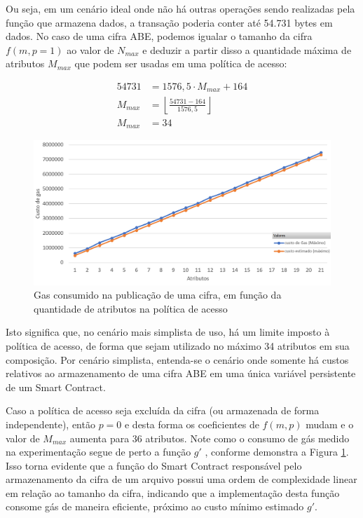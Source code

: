 \documentclass[a4paper,11pt]{article}
\begin{document}
Ou seja, em um cenário ideal onde não há outras operações sendo realizadas pela função que armazena dados, a transação poderia conter até 54.731 bytes em dados.
No caso de uma cifra ABE, podemos igualar o tamanho da cifra $f(m, p = 1)$ ao valor de $N_{max}$ e deduzir a partir disso a quantidade máxima de atributos $M_{max}$ que podem ser usadas em uma política de acesso:

\begin{equation}
  \begin{aligned}
    54731 & = 1576{,}5 \cdot M_{max} + 164 \\
    M_{max} & = \left\lfloor \frac{54731 - 164}{1576{,}5} \right\rfloor \\
    M_{max} & = 34
  \end{aligned}
\end{equation}

\begin{figure}[!h]
    \centering
    \includegraphics[width=\textwidth]{images/resultados-crescimento-custo-cifra.png}
    \caption{Gas consumido na publicação de uma cifra, em função da quantidade de atributos na política de acesso}
    \label{fig:custo-cifra}
\end{figure}

Isto significa que, no cenário mais simplista de uso, há um limite imposto à política de acesso, de forma que sejam utilizado no máximo 34 atributos em sua composição. Por cenário simplista, entenda-se o cenário onde somente há custos relativos ao armazenamento de uma cifra ABE em uma única variável persistente de um Smart Contract.

Caso a política de acesso seja excluída da cifra (ou armazenada de forma independente), então $p = 0$ e desta forma os coeficientes de $f(m, p)$ mudam e o valor de $M_{max}$ aumenta para 36 atributos. Note como o consumo de gás medido na experimentação segue de perto a função  $g'$ , conforme demonstra a Figura \ref{fig:custo-cifra}.
Isso torna evidente que a função do Smart Contract responsável pelo armazenamento da cifra de um arquivo possui uma ordem de complexidade linear em relação ao tamanho da cifra, indicando que a implementação desta função consome gás de maneira eficiente, próximo ao custo mínimo estimado $g'$.
\end{document}
